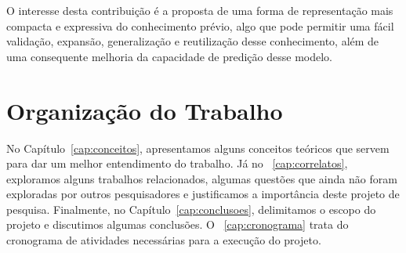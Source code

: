 O interesse desta contribuição é a proposta de uma forma de representação mais compacta e expressiva do conhecimento prévio, algo que pode permitir uma fácil validação, expansão, generalização e reutilização desse conhecimento, além de uma consequente melhoria da capacidade de predição desse modelo.

\section{Organização do Trabalho}
\label{sec:organizacao_trabalho}

No Capítulo~\ref{cap:conceitos}, apresentamos alguns conceitos teóricos que servem para dar um melhor entendimento do trabalho. Já no ~\ref{cap:correlatos}, exploramos alguns trabalhos relacionados, algumas questões que ainda não foram exploradas por outros pesquisadores e justificamos a importância deste projeto de pesquisa.
Finalmente, no Capítulo~\ref{cap:conclusoes}, delimitamos o escopo do projeto e discutimos algumas conclusões. O ~\ref{cap:cronograma} trata do cronograma de atividades necessárias para a execução do projeto.
